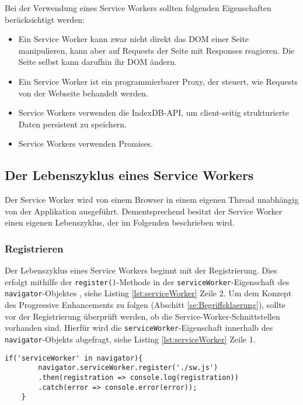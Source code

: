 Bei der Verwendung eines Service Workers sollten folgenden Eigenschaften berücksichtigt werden: 
\begin{itemize}
    \item Ein Service Worker kann zwar nicht direkt das \ac{DOM} einer Seite manipulieren, kann aber auf Requests der Seite mit Responses reagieren. Die Seite selbst kann darufhin ihr DOM ändern.
    \item Ein Service Worker ist ein \glqq programmierbarer\grqq{} Proxy, der steuert, wie Requests von der Webseite behandelt werden.
    \item Service Workers verwenden die IndexDB-API, um client-seitig strukturierte Daten persistent zu speichern.
    \item Service Workers verwenden Promises. 
\end{itemize}

\subsection{Der Lebenszyklus eines Service Workers}

 
Der Service Worker wird von einem Browser in einem eigenen Thread unabhängig von der Applikation ausgeführt. Dementsprechend besitzt der Service Worker einen eigenen Lebenszyklus, der im Folgenden beschrieben wird. 

\subsubsection{Registrieren}
Der Lebenszyklus eines Service Workers beginnt mit der Registrierung. Dies erfolgt mithilfe der \texttt{register()}-Methode in der \texttt{serviceWorker}-Eigenschaft des \texttt{navigator}-Objektes \cite{Navigator2022}, siehe Listing \ref{lst:serviceWorker} Zeile 2. Um dem Konzept des Progressive Enhancements zu folgen (Abschitt \ref{se:Begriffsklaerung}), sollte vor der Registrierung überprüft werden, ob die Service-Worker-Schnittstellen vorhanden sind. Hierfür wird die \texttt{serviceWorker}-Eigenschaft innerhalb des \texttt{navigator}-Objekts abgefragt, siehe Listing \ref{lst:serviceWorker} Zeile 1. 

\begin{lstlisting}[caption = Registrierung des Service Workers, label = lst:serviceWorker, float = !htb]
    if('serviceWorker' in navigator){
        navigator.serviceWorker.register('./sw.js')
        .then(registration => console.log(registration))
        .catch(error => console.error(error));
    }
\end{lstlisting}

